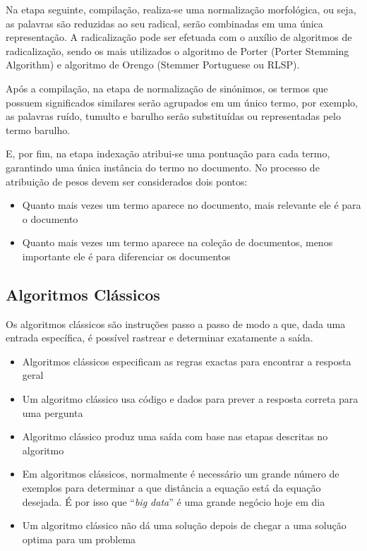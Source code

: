 \documentclass[a4paper,10pt]{article}
\begin{document}
Na etapa seguinte, compilação, realiza-se uma normalização morfológica, ou seja, as palavras são reduzidas ao seu radical, serão combinadas em uma única representação. A radicalização pode ser efetuada com o auxílio de algoritmos de radicalização, sendo os mais utilizados o algoritmo de Porter (Porter Stemming Algorithm) e algoritmo de Orengo (Stemmer Portuguese ou RLSP).

Após a compilação, na etapa de normalização de sinónimos, os termos que possuem significados similares serão agrupados em um único termo, por exemplo, as palavras ruído, tumulto e barulho serão substituídas ou representadas pelo termo barulho.

E, por fim, na etapa indexação atribui-se uma pontuação para cada termo, garantindo uma única instância do termo no documento.
No processo de atribuição de pesos devem ser considerados dois pontos:
\begin{itemize}
  \item Quanto mais vezes um termo aparece no documento, mais relevante ele é para o documento
  \item Quanto mais vezes um termo aparece na coleção de documentos, menos importante ele é para diferenciar os documentos
\end{itemize}

\subsection{Algoritmos Clássicos}

Os algoritmos clássicos são instruções passo a passo de modo a que, dada uma entrada específica, é possível rastrear e determinar exatamente a saída.
\begin{itemize}
  \item Algoritmos clássicos especificam as regras exactas para encontrar a resposta geral
  \item Um algoritmo clássico usa código e dados para prever a resposta correta para uma pergunta
  \item Algoritmo clássico produz uma saída com base nas etapas descritas no algoritmo
  \item Em algoritmos clássicos, normalmente é necessário um grande número de exemplos para determinar a que distância a equação está da equação desejada. É por isso que ``\textit{big data}'' é uma grande negócio hoje em dia
  \item Um algoritmo clássico não dá uma solução depois de chegar a uma solução optima para um problema
\end{itemize}
\end{document}
